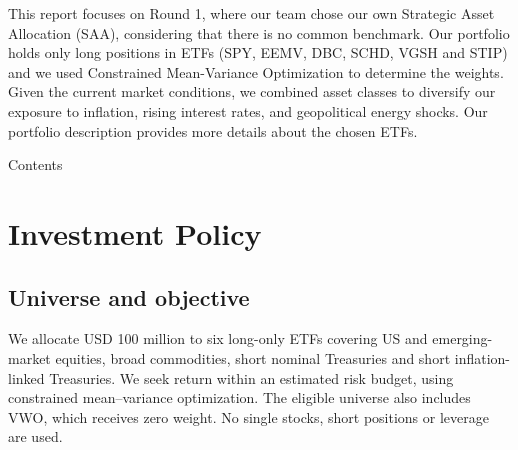 \documentclass[10pt,a4paper]{article}
\renewcommand{\arraystretch}{1.3}
\begin{document}
\begin{callout}

This report focuses on Round 1, where our team chose our own Strategic Asset Allocation (SAA), considering that there is no common benchmark. Our portfolio holds only long positions in ETFs (SPY, EEMV, DBC, SCHD, VGSH and STIP) and we used Constrained Mean-Variance Optimization to determine the weights. Given the current market conditions, we combined asset classes to diversify our exposure to inflation, rising interest rates, and geopolitical energy shocks. Our portfolio description provides more details about the chosen ETFs.


\end{callout}

\vspace{1.2em}
{\rmfamily\Huge\color{navy}Contents\par}
\noindent{\color{gold}\rule{\linewidth}{0.8pt}}
\vspace{-0.4em}
{\renewcommand{\contentsname}{}\vspace*{-2.2em}\tableofcontents}

\clearpage
{}

\begingroup\titleformat{\section}{\rmfamily\LARGE\color{navy}}{\textcolor{gold}{\thesection}\hspace{.6em}}{0pt}{}\titlespacing*{\section}{0pt}{.4em}{.4em}\section{Investment Policy}
\label{sec:cp1}
\begingroup
\small\linespread{1.0}\selectfont\renewcommand{\arraystretch}{1.05}
\setlength{\parskip}{.25em}
\titlespacing*{\subsection}{0pt}{.55em}{.15em}

\subsection{Universe and objective}
We allocate USD 100 million to six long-only ETFs covering US and emerging-market equities, broad commodities, short nominal Treasuries and short inflation-linked Treasuries. We seek return within an estimated risk budget, using constrained mean--variance optimization. The eligible universe also includes VWO, which receives zero weight. No single stocks, short positions or leverage are used.
\end{document}

